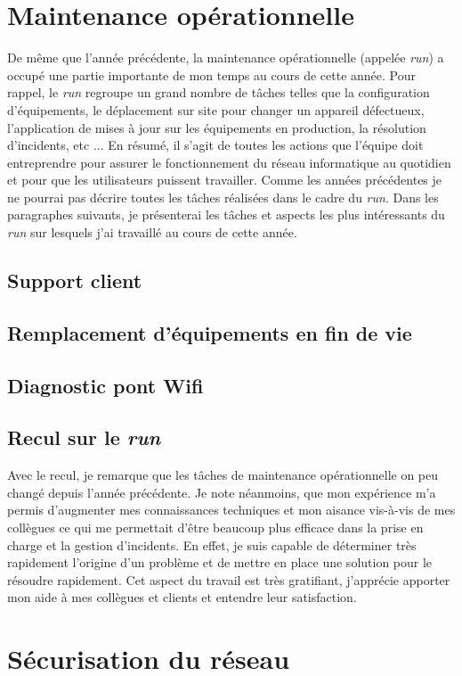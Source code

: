 \documentclass[a4paper,12pt]{report}
\begin{document}
\section{Maintenance opérationnelle}
De même que l'année précédente, la maintenance opérationnelle (appelée \textit{run}) a occupé une partie importante de mon temps au cours de cette année. Pour rappel, le \textit{run} regroupe un grand nombre de tâches telles que la configuration d'équipements, le déplacement sur site pour changer un appareil défectueux, l'application de mises à jour sur les équipements en production, la résolution d'incidents, etc ... En résumé, il s'agit de toutes les actions que l'équipe doit entreprendre pour assurer le fonctionnement du réseau informatique au quotidien et pour que les utilisateurs puissent travailler. Comme les années précédentes je ne pourrai pas décrire toutes les tâches réalisées dans le cadre du \textit{run}. Dans les paragraphes suivants, je présenterai les tâches et aspects les plus intéressants du \textit{run} sur lesquels j'ai travaillé au cours de cette année.

\subsection{Support client}
\subsection{Remplacement d'équipements en fin de vie} %
\subsection{Diagnostic pont Wifi}
\subsection{Recul sur le \textit{run}}
Avec le recul, je remarque que les tâches de maintenance opérationnelle on peu changé depuis l'année précédente. Je note néanmoins, que mon expérience m'a permis d'augmenter mes connaissances techniques et mon aisance vis-à-vis de mes collègues ce qui me permettait d'être beaucoup plus efficace dans la prise en charge et la gestion d'incidents. En effet, je suis capable de déterminer très rapidement l'origine d'un problème et de mettre en place une solution pour le résoudre rapidement. Cet aspect du travail est très gratifiant, j'apprécie apporter mon aide à mes collègues et clients et entendre leur satisfaction.

\section{Sécurisation du réseau}
\end{document}
